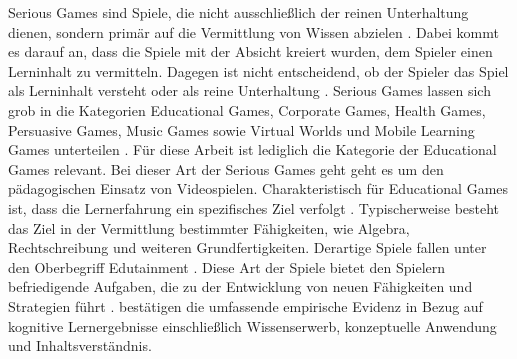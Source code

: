 \documentclass[
    a4paper,
    doc,
    12pt,
    natbib,
]{apa6}
\begin{document}
Serious Games sind Spiele, die nicht ausschließlich der reinen Unterhaltung dienen, sondern primär auf die Vermittlung von Wissen abzielen \citep[S.17]{michael_serious_2005}.
Dabei kommt es darauf an, dass die Spiele mit der Absicht kreiert wurden, dem Spieler einen Lerninhalt zu vermitteln.
Dagegen ist nicht entscheidend, ob der Spieler das Spiel als Lerninhalt versteht oder als reine Unterhaltung \citep[S.3]{bopp_serious_2009}.
Serious Games lassen sich grob in die Kategorien Educational  Games, 
Corporate  Games,  Health  Games,  Persuasive  Games,  Music  Games  sowie  Virtual  Worlds  und 
Mobile Learning Games unterteilen \citep[S.4]{bopp_serious_2009}.
Für diese Arbeit ist lediglich die Kategorie der Educational  Games relevant.
Bei dieser Art der Serious Games geht geht es um den pädagogischen Einsatz von Videospielen.
Charakteristisch für Educational  Games ist, dass die Lernerfahrung ein spezifisches Ziel verfolgt \citep{egenfeldt-nielsen_overview_2006, bopp_serious_2009}.
Typischerweise besteht das Ziel in der Vermittlung bestimmter Fähigkeiten, wie Algebra, Rechtschreibung und weiteren Grundfertigkeiten.
Derartige Spiele fallen unter den Oberbegriff Edutainment \citep{egenfeldt-nielsen_overview_2006}.
Diese Art der Spiele bietet den Spielern befriedigende Aufgaben, die zu der Entwicklung von neuen Fähigkeiten und Strategien führt \citep{stapleton_serious_2004}.
\cite{vlachopoulos_effect_2017} bestätigen die umfassende empirische Evidenz in Bezug auf kognitive Lernergebnisse einschließlich Wissenserwerb, konzeptuelle Anwendung und Inhaltsverständnis.




\end{document}
